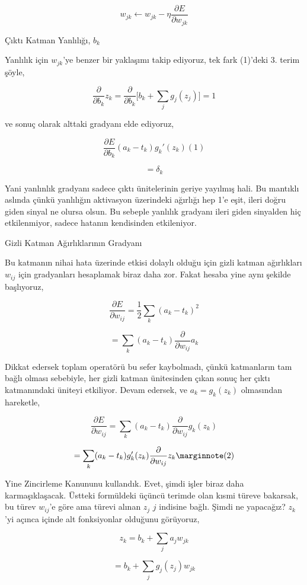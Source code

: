 \documentclass[12pt,fleqn]{article}\usepackage{../../common}
\begin{document}
$$ w_{jk} \leftarrow w_{jk} - \eta  \frac{\partial E}{\partial w_{jk}} $$

Çıktı Katman Yanlılığı, $b_k$

Yanlılık için $w_{jk}$'ye benzer bir yaklaşımı takip ediyoruz, tek fark
(1)'deki 3. terim şöyle, 

$$ 
\frac{\partial }{\partial b_k} z_k = 
\frac{\partial }{\partial b_k} \big[ b_k + \sum_j g_j(z_j) \big] = 1 
$$

ve sonuç olarak alttaki gradyanı elde ediyoruz, 

$$  \frac{\partial E}{\partial b_k} (a_k-t_k) g_k'(z_k)(1)$$

$$ = \delta_k$$

Yani yanlınlık gradyanı sadece çıktı ünitelerinin geriye yayılmış hali. Bu
mantıklı aslında çünkü yanlılığın aktivasyon üzerindeki ağırlığı hep 1'e
eşit, ileri doğru giden sinyal ne olursa olsun. Bu sebeple yanlılık
gradyanı ileri giden sinyalden hiç etkilenmiyor, sadece hatanın kendisinden
etkileniyor. 

Gizli Katman Ağırlıklarının Gradyanı

Bu katmanın nihai hata üzerinde etkisi dolaylı olduğu için gizli katman
ağırlıkları $w_{ij}$ için gradyanları hesaplamak biraz daha zor. Fakat
hesaba yine aynı şekilde başlıyoruz, 

$$ \frac{\partial E}{\partial w_{ij}} = 
\frac{1}{2} \sum_k (a_k-t_k)^2
$$

$$ = \sum_k (a_k-t_k) \frac{\partial }{\partial w_{ij}} a_k$$

Dikkat edersek toplam operatörü bu sefer kaybolmadı, çünkü katmanların tam
bağlı olması sebebiyle, her gizli katman ünitesinden çıkan sonuç her çıktı
katmanındaki üniteyi etkiliyor. Devam edersek, ve $a_k = g_k(z_k)$
olmasından hareketle,

$$ 
\frac{\partial E}{\partial w_{ij}} = 
\sum_k (a_k-t_k) \frac{\partial }{\partial w_{ij}} g_k(z_k)
$$

$$ 
= \sum_k (a_k-t_k) g_k'(z_k) \frac{\partial }{\partial w_{ij}}z_k \mlabel{2}
$$

Yine Zincirleme Kanununu kullandık. Evet, şimdi işler biraz daha
karmaşıklaşacak. Üstteki formüldeki üçüncü terimde olan kısmi türeve
bakarsak, bu türev $w_{ij}$'e göre ama türevi alınan $z_j$ $j$ indisine
bağlı. Şimdi ne yapacağız? $z_k$'yi açınca içinde alt fonksiyonlar olduğunu
görüyoruz, 

$$ z_k = b_k + \sum_j a_j w_{jk}$$

$$ = b_k + \sum_j g_j(z_j) w_{jk}$$
\end{document}
